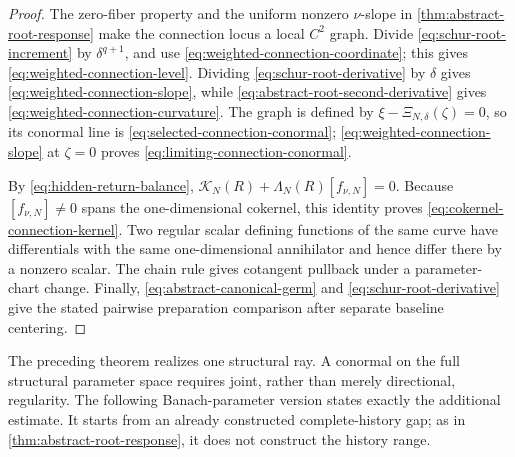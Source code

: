 \begin{proof}
The zero-fiber property and the uniform nonzero \(\nu\)-slope in
\cref{thm:abstract-root-response} make the connection locus a local
\(C^2\) graph.  Divide \cref{eq:schur-root-increment} by
\(\delta^{q+1}\), and use
\cref{eq:weighted-connection-coordinate}; this gives
\cref{eq:weighted-connection-level}.  Dividing
\cref{eq:schur-root-derivative} by \(\delta\) gives
\cref{eq:weighted-connection-slope}, while
\cref{eq:abstract-root-second-derivative} gives
\cref{eq:weighted-connection-curvature}.  The graph is defined by
\(\xi-\Xi_{N,\delta}(\zeta)=0\), so its conormal line is
\cref{eq:selected-connection-conormal};
\cref{eq:weighted-connection-slope} at \(\zeta=0\) proves
\cref{eq:limiting-connection-conormal}.

By \cref{eq:hidden-return-balance},
\(\mathcal K_N(R)+\Lambda_N(R)[f_{\nu,N}]=0\).
Because \([f_{\nu,N}]\ne0\) spans the one-dimensional cokernel, this
identity proves \cref{eq:cokernel-connection-kernel}.  Two regular scalar
defining functions of the same curve have differentials with the same
one-dimensional annihilator and hence differ there by a nonzero scalar.
The chain rule gives cotangent pullback under a parameter-chart change.
Finally, \cref{eq:abstract-canonical-germ} and
\cref{eq:schur-root-derivative} give the stated pairwise preparation
comparison after separate baseline centering.
\end{proof}

The preceding theorem realizes one structural ray.  A conormal on the full
structural parameter space requires joint, rather than merely directional,
regularity.  The following Banach-parameter version states exactly the
additional estimate.  It starts from an already constructed
complete-history gap; as in \cref{thm:abstract-root-response}, it does not
construct the history range.

